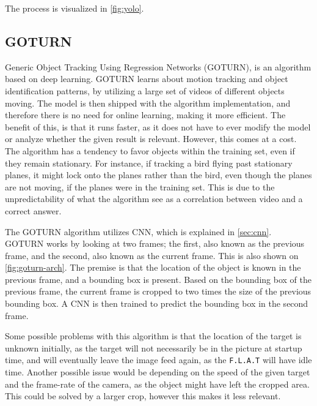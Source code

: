 The process is visualized in \autoref{fig:yolo}.


\subsection{GOTURN}
Generic Object Tracking Using Regression Networks (GOTURN), is an algorithm based on deep learning\cite{goturn}.
GOTURN learns about motion tracking and object identification patterns, by utilizing a large set of videos of different objects moving.
The model is then shipped with the algorithm implementation, and therefore there is no need for online learning, making it more efficient.
The benefit of this, is that it runs faster, as it does not have to ever modify the model or analyze whether the given result is relevant.
However, this comes at a cost. 
The algorithm has a tendency to favor objects within the training set, even if they remain stationary.
For instance, if tracking a bird flying past stationary planes, it might lock onto the planes rather than the bird, even though the planes are not moving, if the planes were in the training set.
This is due to the unpredictability of what the algorithm see as a correlation between video and a correct answer.


The GOTURN algorithm utilizes CNN, which is explained in \autoref{sec:cnn}.
GOTURN works by looking at two frames; the first, also known as the previous frame, and the second, also known as the current frame.
This is also shown on \autoref{fig:goturn-arch}.
The premise is that the location of the object is known in the previous frame, and a bounding box is present.
Based on the bounding box of the previous frame, the current frame is cropped to two times the size of the previous bounding box.
A CNN is then trained to predict the bounding box in the second frame.

Some possible problems with this algorithm is that the location of the target is unknown initially, as the target will not necessarily be in the picture at startup time, and will eventually leave the image feed again, as the \texttt{F.L.A.T} will have idle time.
Another possible issue would be depending on the speed of the given target and the frame-rate of the camera, as the object might have left the cropped area. 
This could be solved by a larger crop, however this makes it less relevant.



